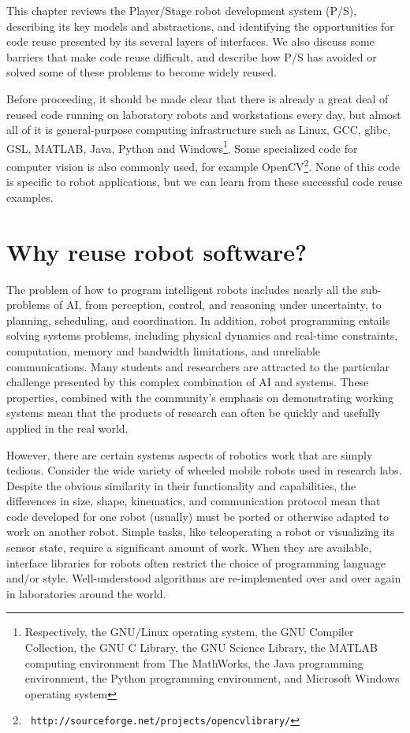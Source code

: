 This chapter reviews the Player/Stage robot development system (P/S),
describing its key models and abstractions, and identifying the
opportunities for code reuse presented by its several layers of
interfaces. We also discuss some barriers that make code reuse
difficult, and describe how P/S has avoided or solved some of these
problems to become widely reused.

Before proceeding, it should be made clear that there is already a
great deal of reused code running on laboratory robots and
workstations every day, but almost all of it is general-purpose
computing infrastructure such as Linux, GCC, glibc, GSL, MATLAB, Java,
Python and Windows\footnote{Respectively, the GNU/Linux operating
system, the GNU Compiler Collection, the GNU C Library, the GNU
Science Library, the MATLAB computing environment from The MathWorks,
the Java programming environment, the Python programming environment,
and Microsoft Windows operating system}. Some specialized code for
computer vision is also commonly used, for example OpenCV\footnote{\tt
http://sourceforge.net/projects/opencvlibrary/}. None of this code is
specific to robot applications, but we can learn from these successful
code reuse examples.


\section{Why reuse robot software?}

The problem of how to program intelligent robots includes nearly all
the sub-problems of AI, from perception, control, and reasoning under
uncertainty, to planning, scheduling, and coordination.  In addition,
robot programming entails solving systems problems, including physical
dynamics and real-time constraints, computation, memory and bandwidth
limitations, and unreliable communications. Many students and
researchers are attracted to the particular challenge presented by
this complex combination of AI and systems. These properties, combined
with the community's emphasis on demonstrating working systems mean
that the products of research can often be quickly and usefully
applied in the real world.

However, there are certain systems aspects of robotics work that are
simply tedious.  Consider the wide variety of wheeled mobile robots
used in research labs.  Despite the obvious similarity in their
functionality and capabilities, the differences in size, shape,
kinematics, and communication protocol mean that code developed for
one robot (usually) must be ported or otherwise adapted to work on
another robot.  Simple tasks, like teleoperating a robot or
visualizing its sensor state, require a significant amount of work.
When they are available, interface libraries for robots often restrict
the choice of programming language and/or style.  Well-understood
algorithms are re-implemented over and over again in laboratories
around the world.

